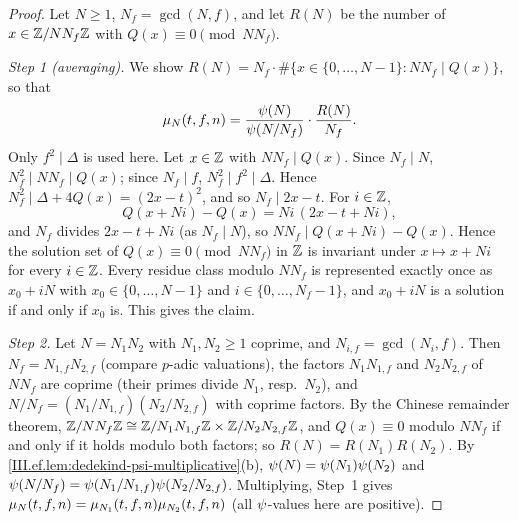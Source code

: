 \begin{theorem}
\end{theorem}
\begin{proof}
Let $N\ge1$, $N_f=\gcd(N,f)$, and let $R(N)$ be the number of $x\in\mathbb{Z}/NN_f\mathbb{Z}$ with $Q(x)\equiv0\pmod{NN_f}$.

\emph{Step 1 (averaging).} We show $R(N)=N_f\cdot\#\{x\in\{0,\dots,N-1\}:NN_f\mid Q(x)\}$, so that
\[
  \mu_N(t,f,n)=\frac{\psi(N)}{\psi(N/N_f)}\cdot\frac{R(N)}{N_f}.
\]
Only $f^2\mid\Delta$ is used here. Let $x\in\mathbb{Z}$ with $NN_f\mid Q(x)$. Since $N_f\mid N$, $N_f^2\mid NN_f\mid Q(x)$; since $N_f\mid f$,
$N_f^2\mid f^2\mid\Delta$. Hence $N_f^2\mid\Delta+4Q(x)=(2x-t)^2$, and so $N_f\mid2x-t$. For $i\in\mathbb{Z}$,
\[
  Q(x+Ni)-Q(x)=Ni\,(2x-t+Ni),
\]
and $N_f$ divides $2x-t+Ni$ (as $N_f\mid N$), so $NN_f\mid Q(x+Ni)-Q(x)$. Hence the solution set of $Q(x)\equiv0\pmod{NN_f}$ in $\mathbb{Z}$ is invariant
under $x\mapsto x+Ni$ for every $i\in\mathbb{Z}$. Every residue class modulo $NN_f$ is represented exactly once as $x_0+iN$ with $x_0\in\{0,\dots,N-1\}$ and
$i\in\{0,\dots,N_f-1\}$, and $x_0+iN$ is a solution if and only if $x_0$ is. This gives the claim.

\emph{Step 2.} Let $N=N_1N_2$ with $N_1,N_2\ge1$ coprime, and $N_{i,f}=\gcd(N_i,f)$. Then $N_f=N_{1,f}N_{2,f}$ (compare $p$-adic valuations), the
factors $N_1N_{1,f}$ and $N_2N_{2,f}$ of $NN_f$ are coprime (their primes divide $N_1$, resp.\ $N_2$), and $N/N_f=(N_1/N_{1,f})(N_2/N_{2,f})$ with
coprime factors. By the Chinese remainder theorem, $\mathbb{Z}/NN_f\mathbb{Z}\cong\mathbb{Z}/N_1N_{1,f}\mathbb{Z}\times\mathbb{Z}/N_2N_{2,f}\mathbb{Z}$, and $Q(x)\equiv0$ modulo $NN_f$ if and only if it
holds modulo both factors; so $R(N)=R(N_1)R(N_2)$. By \cref{III.ef.lem:dedekind-psi-multiplicative}(b), $\psi(N)=\psi(N_1)\psi(N_2)$ and
$\psi(N/N_f)=\psi(N_1/N_{1,f})\psi(N_2/N_{2,f})$. Multiplying, Step~1 gives
$\mu_N(t,f,n)=\mu_{N_1}(t,f,n)\mu_{N_2}(t,f,n)$ (all $\psi$-values here are positive).
\end{proof}


